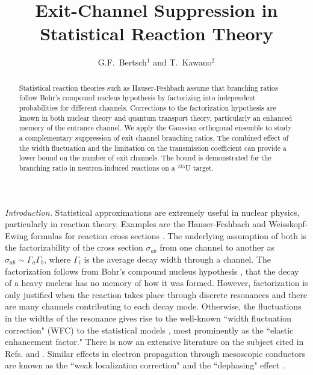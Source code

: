 \documentclass[prl,aps,floatfix,nofootinbib,preprint]{revtex4}
\begin{document}
 

\title{Exit-Channel Suppression in Statistical Reaction Theory
}
\author{G.F.~Bertsch$^{1}$ and T.~Kawano$^{2}$}
 
 
\begin{abstract}

Statistical reaction theories such as Hauser-Feshbach  
assume that branching ratios follow Bohr's compound nucleus hypothesis
by factorizing into independent probabilities for 
different channels. Corrections
to the factorization hypothesis are known in both nuclear theory and
quantum transport theory, particularly an enhanced memory of the
entrance channel.  
We apply the Gaussian orthogonal ensemble to study a complementary 
suppression of exit channel branching ratios.  The combined effect of the
width fluctuation and the limitation on the transmission coefficient 
can provide a lower bound on the number of exit channels.
The bound is demonstrated 
for the branching ratio in neutron-induced reactions on a 
$^{235}$U target. \\ 
\end{abstract}
\maketitle 
 

{\it Introduction.} Statistical approximations are extremely useful in nuclear physics,
particularly in reaction theory.  Examples are the  
Hauser-Feshbach and Weisskopf-Ewing formulas for reaction cross sections
\cite{es06,we40,ha52}.  
The underlying assumption of both is the factorizability of the cross section
$\sigma_{ab}$ from one channel to another as $\sigma_{ab} \sim \Gamma_a \Gamma_b$, 
where $\Gamma_i$ is the average decay width through a channel.  The factorization
follows from  Bohr's compound nucleus hypothesis \cite{bo36},
that the decay of a heavy nucleus
has no memory of how it was formed.  However, factorization is only 
justified when the reaction takes place through discrete resonances
and there are many channels contributing to each decay mode. Otherwise,
the  fluctuations in the widths of the resonance gives rise to the
well-known ``width fluctuation correction" (WFC) to the statistical models 
\cite{mo75}, most prominently as the ``elastic enhancement factor."  There
is now an extensive literature on the subject cited in Refs. \cite{mi10} 
and \cite{ka15}.  
Similar effects in electron propagation through mesoscopic conductors
are known as the  ``weak localization correction" 
and the ``dephasing" effect \cite[Sect. IV.C and IV.E]{al00}.
\end{document}
